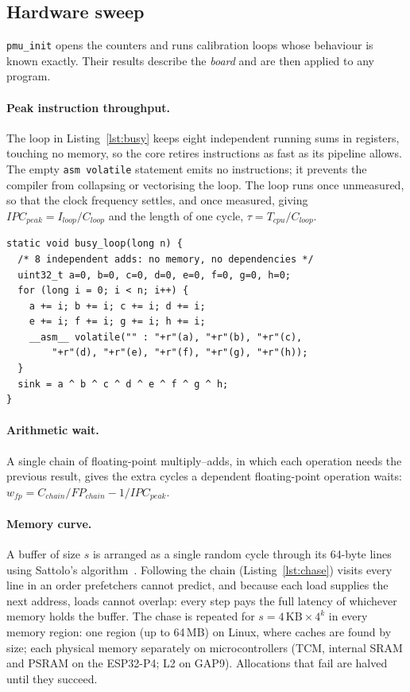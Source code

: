 \documentclass[10pt,a4paper,twocolumn]{article}
\newcommand{\code}[1]{\texttt{\small #1}}
\begin{document}
\subsection{Hardware sweep}\label{sec:sweep}
\code{pmu\_init} opens the counters and runs calibration loops whose behaviour is known exactly. Their results describe the \emph{board} and are then applied to any program.

\paragraph{Peak instruction throughput.} The loop in Listing~\ref{lst:busy} keeps eight independent running sums in registers, touching no memory, so the core retires instructions as fast as its pipeline allows. The empty \code{asm volatile} statement emits no instructions; it prevents the compiler from collapsing or vectorising the loop. The loop runs once unmeasured, so that the clock frequency settles, and once measured, giving $IPC_{peak}=I_{loop}/C_{loop}$ and the length of one cycle, $\tau = T_{cpu}/C_{loop}$.

\begin{lstlisting}[caption={Calibration loop for peak instruction throughput.},label={lst:busy}]
static void busy_loop(long n) {
  /* 8 independent adds: no memory, no dependencies */
  uint32_t a=0, b=0, c=0, d=0, e=0, f=0, g=0, h=0;
  for (long i = 0; i < n; i++) {
    a += i; b += i; c += i; d += i;
    e += i; f += i; g += i; h += i;
    __asm__ volatile("" : "+r"(a), "+r"(b), "+r"(c),
        "+r"(d), "+r"(e), "+r"(f), "+r"(g), "+r"(h));
  }
  sink = a ^ b ^ c ^ d ^ e ^ f ^ g ^ h;
}
\end{lstlisting}

\paragraph{Arithmetic wait.} A single chain of floating-point multiply--adds, in which each operation needs the previous result, gives the extra cycles a dependent floating-point operation waits: $w_{fp} = C_{chain}/FP_{chain} - 1/IPC_{peak}$.

\paragraph{Memory curve.} A buffer of size $s$ is arranged as a single random cycle through its 64-byte lines using Sattolo's algorithm~\cite{sattolo}. Following the chain (Listing~\ref{lst:chase}) visits every line in an order prefetchers cannot predict, and because each load supplies the next address, loads cannot overlap: every step pays the full latency of whichever memory holds the buffer. The chase is repeated for $s = 4\,\mathrm{KB}\times4^k$ in every memory region: one region (up to 64\,MB) on Linux, where caches are found by size; each physical memory separately on microcontrollers (TCM, internal SRAM and PSRAM on the ESP32-P4; L2 on GAP9). Allocations that fail are halved until they succeed.
\end{document}

